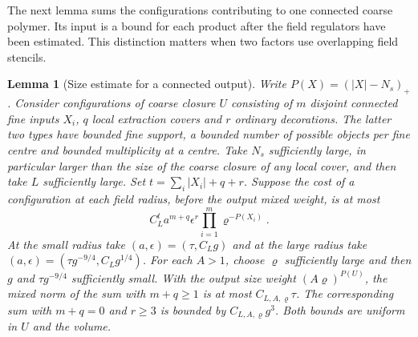 \documentclass[11pt]{article}
\newtheorem{lemma}[theorem]{Lemma}
\theoremstyle{definition}
\begin{document}
The next lemma sums the configurations contributing to one connected
coarse polymer. Its input is a bound for each product after the
field regulators have been estimated. This distinction matters when
two factors use overlapping field stencils.

\begin{lemma}[Size estimate for a connected output]
\label{lem:cube-connected-size}
Write \(P(X)=(|X|-N_s)_+\). Consider configurations of coarse closure
\(U\) consisting of \(m\) disjoint connected fine inputs \(X_i\),
\(q\) local extraction covers and \(r\) ordinary decorations.
The latter two types have bounded fine support, a bounded number of
possible objects per fine centre and bounded multiplicity at a centre.
Take \(N_s\) sufficiently large, in particular larger than the size of
the coarse closure of any local cover, and then take \(L\) sufficiently
large. Set \(t=\sum_i |X_i|+q+r\).
Suppose the cost of a configuration at each field radius, before the
output mixed weight, is at most
\begin{equation}
 C_L^t a^{m+q}\epsilon^r
                \prod_{i=1}^m\varrho^{-P(X_i)}.
\end{equation}
At the small radius take \((a,\epsilon)=(\tau,C_Lg)\) and at the
large radius take \((a,\epsilon)=(\tau g^{-9/4},C_Lg^{1/4})\).
For each \(A>1\), choose \(\varrho\) sufficiently large and then
\(g\) and \(\tau g^{-9/4}\) sufficiently small. With the output
size weight \((A\varrho)^{P(U)}\), the mixed norm of the sum with
\(m+q\ge1\) is at most \(C_{L,A,\varrho}\tau\). The corresponding
sum with \(m+q=0\) and \(r\ge3\) is bounded by
\(C_{L,A,\varrho}g^3\). Both bounds are uniform in \(U\) and the
volume.
\end{lemma}
\end{document}
